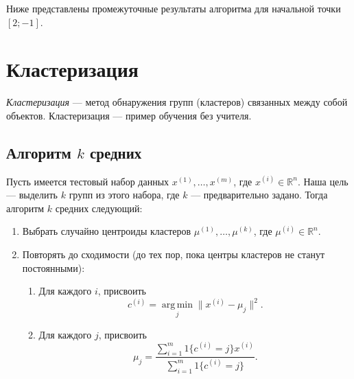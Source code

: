 Ниже представлены промежуточные результаты алгоритма для начальной точки $[2; -1]$.
\IfNotDraft
{
\begin{figure}[htb]
  \centering
\end{figure}
}

\section{Кластеризация}
\emph{Кластеризация} — метод обнаружения групп (кластеров) связанных между собой объектов. Кластеризация — пример обучения без учителя.

\subsection{Алгоритм $k$ средних}
Пусть имеется тестовый набор данных $x^{(1)}, \dots, x^{(m)}$, где $x^{(i)} \in \mathbb{R}^n$. Наша цель — выделить $k$ групп из этого набора, где $k$ — предварительно задано. Тогда алгоритм $k$ средних следующий:
\begin{enumerate}
  \item Выбрать случайно центроиды кластеров $\mu^{(1)}, \dots, \mu^{(k)}$, где $\mu^{(i)} \in \mathbb{R}^n$.
  \item Повторять до сходимости (до тех пор, пока центры кластеров не станут постоянными):
    \begin{enumerate}
      \item Для каждого $i$, присвоить \[ c^{(i)} = \operatorname*{arg\,min}_j \| x^{(i)} - \mu_j \|^2. \]
      \item Для каждого $j$, присвоить \[ \mu_j = \frac{\sum_{i = 1}^{m}{1\{ c^{(i)} = j \} x^{(i)}}}{\sum_{i = 1}^{m}{1\{ c^{(i)} = j \}}}. \]
    \end{enumerate}
\end{enumerate}

